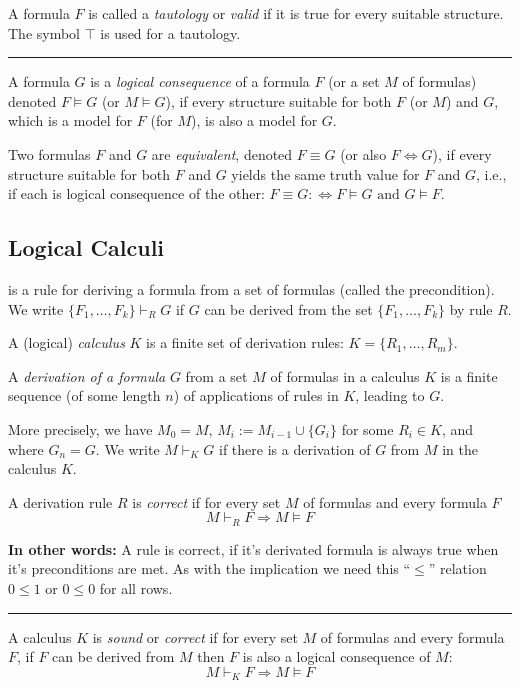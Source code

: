 \documentclass[a4paper]{extarticle}
\newcommand{\derives}{\vdash}
\newcommand{\sep}{\vspace{5pt}\noindent\hrule\vspace{5pt}}
\begin{document}
\begin{multicols*}{2}
\Def[Tautology] A formula $F$ is called a \emph{tautology} or \emph{valid} if it
is true for every suitable structure. The symbol $\top$ is used for a tautology.

\sep

 A formula $G$ is a \emph{logical consequence} of a
formula $F$ (or a set $M$ of formulas) denoted $F\models G$ (or $M\models G$),
if every structure suitable for both $F$ (or $M$) and $G$, which is a model for
$F$ (for $M$), is also a model for $G$.

\Def[Equivalence] Two formulas $F$ and $G$ are \emph{equivalent}, denoted
$F\equiv G$ (or also $F\Longleftrightarrow G$), if every structure suitable for
both $F$ and $G$ yields the same truth value for $F$ and $G$, i.e., if each is
logical consequence of the other: $F\equiv G :\Longleftrightarrow	F\models G
\text{ and } G \models F$.

\subsection{Logical Calculi}

 is a rule for deriving a formula from a set of formulas
(called the precondition). We write $\{F_1,\ldots,F_k\} \derives_R G$ if $G$ can
be derived from the set $\{F_1,\ldots,F_k\}$ by rule $R$.

\Def[Calculus] A (logical) \emph{calculus} $K$ is a finite set of derivation
rules: $K=\{R_1,\ldots,R_m\}$.

\Def[Derivation] A \emph{derivation of a formula} $G$ from a set $M$ of formulas
in a calculus $K$ is a finite sequence (of some length $n$) of applications of
rules in $K$, leading to $G$.

More precisely, we have $M_0=M$, $M_i:=M_{i-1}\cup\{G_i\}$ for some $R_i\in
K$, and where $G_n = G$. We write $M\derives_K G$ if there is a derivation of
$G$ from $M$ in the calculus $K$.

\Def[Correctness] A derivation rule $R$ is \emph{correct} if for every set $M$
of formulas and every formula $F$
\[
M\derives_R F\Longrightarrow M\models F
\]

\textbf{In other words:} A rule is correct, if it's derivated formula is always
true when it's preconditions are met. As with the implication we need this
``$\leq$'' relation $0\leq 1$ or $0\leq 0$ for all rows.

\sep

\Def[Soundness] A calculus $K$ is \emph{sound} or \emph{correct} if for every
set $M$ of formulas and every formula $F$, if $F$ can be derived from $M$ then
$F$ is also a logical consequence of $M$:
\[
M\derives_K F\Longrightarrow M\models F
\]


\end{multicols*}
\end{document}
